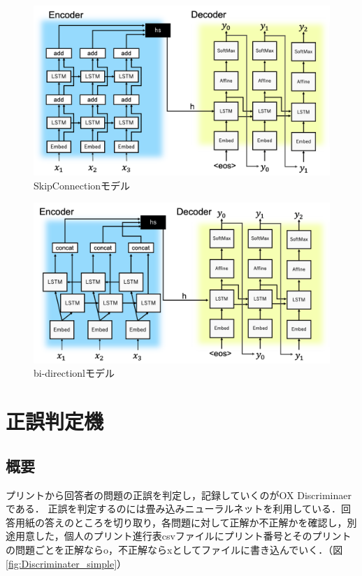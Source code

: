 \documentclass[a4j,11pt,report]{jsbook}
\begin{document}
\begin{center}
  \begin{figure}[H]
    \centering
    \includegraphics[width=\linewidth]{image/Skipconnect.png}
    \caption{SkipConnectionモデル}
    \label{fig:SkipSeq2seq}
  \end{figure}
\end{center}



\begin{center}
  \begin{figure}[H]
    \centering
    \includegraphics[width=\linewidth]{image/twinRNN.png}
    \caption{bi-directionlモデル}
    \label{fig:bi-directionl Seq2seq}
  \end{figure}
\end{center}


\clearpage
\section{正誤判定機}
\subsection{概要}
プリントから回答者の問題の正誤を判定し，記録していくのがOX Discriminaerである．
正誤を判定するのには畳み込みニューラルネットを利用している．回答用紙の答えのところを切り取り，各問題に対して正解か不正解かを確認し，別途用意した，個人のプリント進行表csvファイルにプリント番号とそのプリントの問題ごとを正解ならo，不正解ならxとしてファイルに書き込んでいく．（図\ref{fig:Discriminater_simple}）
\end{document}
